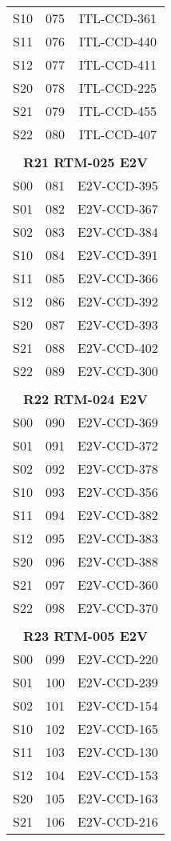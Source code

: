 \begin{longtable}{ccc}
  S10 & 075 & ITL-CCD-361 \\
  S11 & 076 & ITL-CCD-440 \\
  S12 & 077 & ITL-CCD-411 \\
  S20 & 078 & ITL-CCD-225 \\
  S21 & 079 & ITL-CCD-455 \\
  S22 & 080 & ITL-CCD-407 \\
 & & \\
\multicolumn{3}{c}{\bf R21  RTM-025  E2V} \\
\hline
  S00 & 081 & E2V-CCD-395 \\
  S01 & 082 & E2V-CCD-367 \\
  S02 & 083 & E2V-CCD-384 \\
  S10 & 084 & E2V-CCD-391 \\
  S11 & 085 & E2V-CCD-366 \\
  S12 & 086 & E2V-CCD-392 \\
  S20 & 087 & E2V-CCD-393 \\
  S21 & 088 & E2V-CCD-402 \\
  S22 & 089 & E2V-CCD-300 \\
 & & \\
\multicolumn{3}{c}{\bf R22  RTM-024  E2V} \\
\hline
  S00 & 090 & E2V-CCD-369 \\
  S01 & 091 & E2V-CCD-372 \\
  S02 & 092 & E2V-CCD-378 \\
  S10 & 093 & E2V-CCD-356 \\
  S11 & 094 & E2V-CCD-382 \\
  S12 & 095 & E2V-CCD-383 \\
  S20 & 096 & E2V-CCD-388 \\
  S21 & 097 & E2V-CCD-360 \\
  S22 & 098 & E2V-CCD-370 \\
 & & \\
\multicolumn{3}{c}{\bf R23  RTM-005  E2V} \\
\hline
  S00 & 099 & E2V-CCD-220 \\
  S01 & 100 & E2V-CCD-239 \\
  S02 & 101 & E2V-CCD-154 \\
  S10 & 102 & E2V-CCD-165 \\
  S11 & 103 & E2V-CCD-130 \\
  S12 & 104 & E2V-CCD-153 \\
  S20 & 105 & E2V-CCD-163 \\
  S21 & 106 & E2V-CCD-216 \\

\end{longtable}

